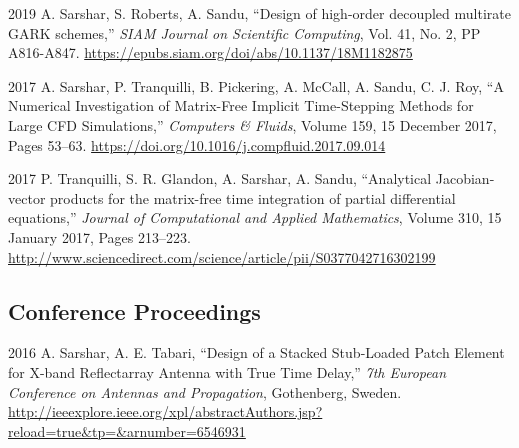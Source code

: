 \documentclass[11pt,letterpaper]{report}
\newcommand{\paperinfo}[5]{
    \tab{}
    #1, %
    \enquote{#2,} %
    \textit{#3}, %
    #4. %
    \href{#5}{#5} %
}
\begin{document}
\begin{tablist}
    \item[2019] \paperinfo{A. Sarshar, S. Roberts, A. Sandu}
        {Design of high-order decoupled multirate GARK schemes}
        {SIAM Journal on Scientific Computing}{Vol. 41, No. 2, PP A816-A847}
        {https://epubs.siam.org/doi/abs/10.1137/18M1182875}

    \item[2017] \paperinfo{A. Sarshar, P. Tranquilli, B. Pickering, A. McCall, A. Sandu, C. J. Roy}
        {A Numerical Investigation of Matrix-Free Implicit Time-Stepping Methods for Large CFD Simulations}
        {Computers \& Fluids}{Volume 159, 15 December 2017, Pages 53--63}
        {https://doi.org/10.1016/j.compfluid.2017.09.014}

    \item[2017] \paperinfo{P. Tranquilli, S. R. Glandon, A. Sarshar, A. Sandu}
        {Analytical Jacobian-vector products for the matrix-free time integration of partial differential equations}
        {Journal of Computational and Applied Mathematics}{Volume 310, 15 January 2017, Pages 213--223}
        {http://www.sciencedirect.com/science/article/pii/S0377042716302199}

    \end{tablist}







    \subsection*{Conference Proceedings}

    \begin{tablist}
    
    \item[2016] \paperinfo{A. Sarshar, A. E. Tabari}
    {Design of a Stacked Stub-Loaded Patch Element for X-band Reflectarray Antenna with True Time Delay}
    {7th European Conference on Antennas and Propagation}
    {Gothenberg, Sweden}
    {http://ieeexplore.ieee.org/xpl/abstractAuthors.jsp?reload=true\&tp=\&arnumber=6546931}

    \end{tablist}
\end{document}
